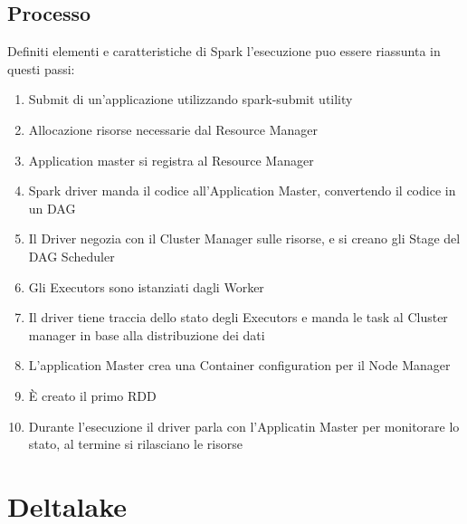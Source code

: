 \documentclass[a4paper]{article}
\begin{document}
\subsection{Processo}
Definiti elementi e caratteristiche di Spark l'esecuzione puo essere riassunta 
in questi passi:
\begin{enumerate}
    \item Submit di un'applicazione utilizzando spark-submit utility
    \item Allocazione risorse necessarie dal Resource Manager
    \item Application master si registra al Resource Manager
    \item Spark driver manda il codice all'Application Master, convertendo il codice
    in un DAG
    \item Il Driver negozia con il Cluster Manager sulle risorse, e si creano gli Stage del 
    DAG Scheduler
    \item Gli Executors sono istanziati dagli Worker
    \item Il driver tiene traccia dello stato degli Executors e manda le task al 
    Cluster manager in base alla distribuzione dei dati
    \item L'application Master crea una Container configuration per il Node Manager
    \item È creato il primo RDD
    \item Durante l'esecuzione il driver parla con l'Applicatin Master per monitorare
    lo stato, al termine si rilasciano le risorse
\end{enumerate}

\section{Deltalake}





\end{document}
